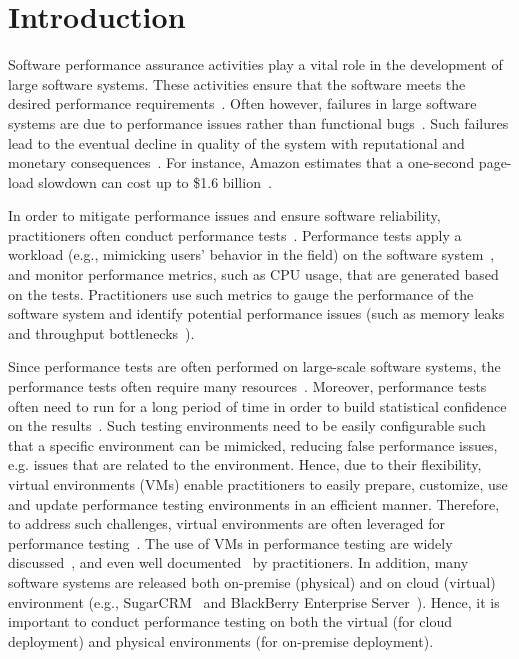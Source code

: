 

\section{Introduction}
Software performance assurance activities play a vital role in the development of large software systems. These activities ensure that the software meets the desired performance requirements~\cite{futureofspe}. Often however, failures in large software systems are due to performance issues rather than functional bugs~\cite{tailatscale, foo2010mining}. Such failures lead to the eventual decline in quality of the system with reputational and monetary consequences~\cite{costofdowntime}. For instance, Amazon estimates that a one-second page-load slowdown can cost up to \$1.6 billion~\cite{amazononesec}. 

In order to mitigate performance issues and ensure software reliability, practitioners often conduct performance tests~\cite{futureofspe}. Performance tests apply a workload (e.g., mimicking users' behavior in the field) on the software system~\cite{ranjanbook,Syer2016}, and monitor performance metrics, such as CPU usage, that are generated based on the tests. Practitioners use such metrics to gauge the performance of the software system and identify potential performance issues (such as memory leaks~\cite{markicsm2013} and throughput bottlenecks~\cite{5635038}).

Since performance tests are often performed on large-scale software systems, the performance tests often require many resources~\cite{ranjanbook}. Moreover, performance tests often need to run for a long period of time in order to build statistical confidence on the results~\cite{ranjanbook}. Such testing environments need to be easily configurable such that a specific environment can be mimicked, reducing false performance issues, e.g. issues that are related to the environment. Hence, due to their flexibility, virtual environments (VMs) enable practitioners to easily prepare, customize, use and update performance testing environments in an efficient manner. Therefore, to address such challenges, virtual environments are often leveraged for performance testing~\cite{whyvirtualisbetter, vmwarehighcost}. The use of VMs in performance testing are widely discussed~\cite{performanceonvvirtual, stackoverflow, windowsserver}, and even well documented~\cite{sugarcrmexp} by practitioners. In addition, many software systems are released both on-premise (physical) and on cloud (virtual) environment (e.g., SugarCRM~\cite{sugarcrm} and BlackBerry Enterprise Server~\cite{bes}). Hence, it is important to conduct performance testing on both the virtual (for cloud deployment) and physical environments (for on-premise deployment).

